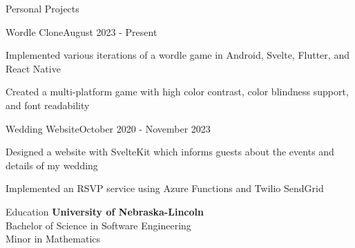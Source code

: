 \documentclass[
	11pt, %
]{resume} %
\begin{document}
\begin{rSection}{Personal Projects}

	\begin{rSubsection}{Wordle Clone}{August 2023 - Present}{}{}
		\item Implemented various iterations of a wordle game in Android, Svelte, Flutter, and React Native
		\item Created a multi-platform game with high color contrast, color blindness support, and font readability
	\end{rSubsection}

	\begin{rSubsection}{Wedding Website}{October 2020 - November 2023}{}{}
		\item Designed a website with SvelteKit which informs guests about the events and details of my wedding
		\item Implemented an RSVP service using Azure Functions and Twilio SendGrid
	\end{rSubsection}

\end{rSection}

\begin{rSection}{Education}
	\textbf{University of Nebraska-Lincoln} \\
	Bachelor of Science in Software Engineering \\
	Minor in Mathematics
\end{rSection}





\end{document}

